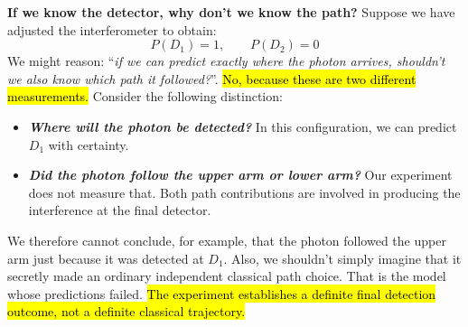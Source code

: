 \highspace
\textcolor{Green3}{ \textbf{If we know the detector, why don't we know the path?}} Suppose we have adjusted the interferometer to obtain:
\begin{equation*}
    P(D_1)=1,\qquad P(D_2)=0
\end{equation*}
We might reason: ``\emph{if we can predict exactly where the photon arrives, shouldn't we also know which path it followed?}''. \hl{No, because these are two different measurements.} Consider the following distinction:
\begin{itemize}
    \item \emph{\textbf{Where will the photon be detected?}} In this configuration, we can predict $D_1$ with certainty.

    \item \emph{\textbf{Did the photon follow the upper arm or lower arm?}} Our experiment does not measure that. Both path contributions are involved in producing the interference at the final detector.
\end{itemize}
We therefore cannot conclude, for example, that the photon followed the upper arm just because it was detected at $D_1$. Also, we shouldn't simply imagine that it secretly made an ordinary independent classical path choice. That is the model whose predictions failed. \hl{The experiment establishes a definite final detection outcome, not a definite classical trajectory.}